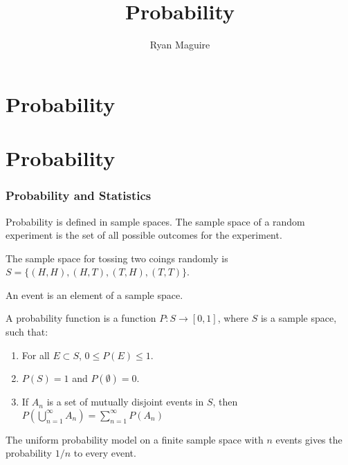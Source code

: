 \documentclass[crop=false,class=book,oneside]{standalone}
\begin{document}
    \ifx\ifmathcourses\undefined
        \title{Probability}
        \author{Ryan Maguire}
        \date{\vspace{-5ex}}
        \maketitle
        \tableofcontents
        \chapter*{Probability}
        \setcounter{chapter}{1}
    \else
        \chapter{Probability}
    \fi
    \subsection{Probability and Statistics}
        Probability is defined in sample spaces. The sample space of
        a random experiment is the set of all
        possible outcomes for the experiment.
        \begin{example}
            The sample space for tossing two coings randomly is
            $S=\{(H,H),(H,T),(T,H),(T,T)\}$.
        \end{example}
        \begin{definition}
            An event is an element of a sample space.
        \end{definition}
        \begin{definition}
            A probability function is a function
            $P:S\rightarrow[0,1]$, where $S$ is a sample
            space, such that:
            \begin{enumerate}
                \item For all $E\subset{S}$, $0\leq{P(E)}\leq{1}$.
                \item $P(S)=1$ and $P(\emptyset)=0$.
                \item If $A_{n}$ is a set of mutually disjoint
                      events in $S$, then
                      $P(\bigcup_{n=1}^{\infty}A_{n})%
                       =\sum_{n=1}^{\infty}P(A_{n})$
            \end{enumerate}
        \end{definition}
        The uniform probability model on a finite sample space with
        $n$ events gives the probability $1/n$ to every event.
\end{document}
